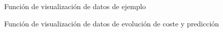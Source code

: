 \documentclass[6pt]{../../shared/AiTex}
\begin{document}
\begin{figure}[H]
    \centering
    
    \caption{Función de visualización de datos de ejemplo}
    \label{fig:plot_ex_data}
\end{figure}

\begin{figure}[H]
    \centering
    
    \caption{Función de visualización de datos de evolución de coste y predicción}
    \label{fig:plot_linear_data}
\end{figure}
\end{document}
